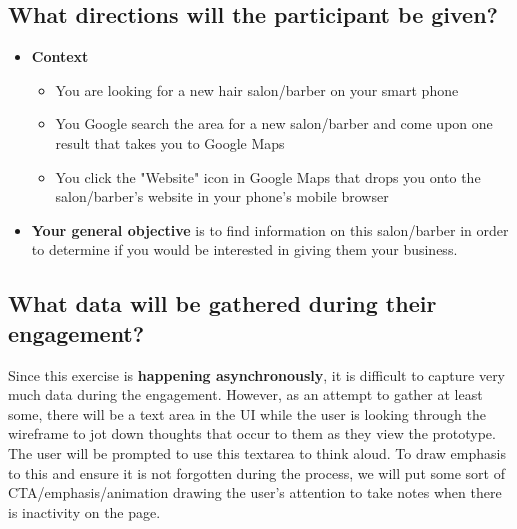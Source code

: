 \subsection{What directions will the participant be given?}
\begin{itemize}
\item
  \textbf{Context}
  \begin{itemize}
  \item
    You are looking for a new hair salon/barber on your smart phone
  \item
    You Google search the area for a new salon/barber and come upon one result that takes you to Google Maps
  \item
    You click the "Website" icon in Google Maps that drops you onto the salon/barber's website in your phone's mobile browser
  \end{itemize}

\clearpage

\item
  \textbf{Your general objective} is to find information on this salon/barber in order to determine if you would be interested in giving them your business.
\end{itemize}

\subsection{What data will be gathered during their engagement?}
Since this exercise is \textbf{happening asynchronously}, it is difficult to capture very much data during the engagement. However, as an attempt to gather at least some, there will be a text area in the UI while the user is looking through the wireframe to jot down thoughts that occur to them as they view the prototype. The user will be prompted to use this textarea to think aloud. To draw emphasis to this and ensure it is not forgotten during the process, we will put some sort of CTA/emphasis/animation drawing the user's attention to take notes when there is inactivity on the page.

